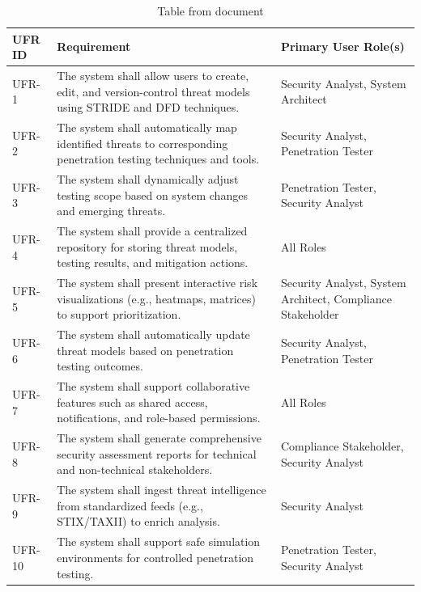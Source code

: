 \documentclass[12pt,a4paper]{report}
\begin{document}
\begin{table}[H]
\centering
\small
\begin{tabularx}{\textwidth}{|l|l|l|}
\hline
UFR ID & Requirement & Primary User Role(s) \\
\hline\hline
UFR-1 & The system shall allow users to create, edit, and version-control threat models using STRIDE and DFD techniques. & Security Analyst, System Architect \\
\hline
UFR-2 & The system shall automatically map identified threats to corresponding penetration testing techniques and tools. & Security Analyst, Penetration Tester \\
\hline
UFR-3 & The system shall dynamically adjust testing scope based on system changes and emerging threats. & Penetration Tester, Security Analyst \\
\hline
UFR-4 & The system shall provide a centralized repository for storing threat models, testing results, and mitigation actions. & All Roles \\
\hline
UFR-5 & The system shall present interactive risk visualizations (e.g., heatmaps, matrices) to support prioritization. & Security Analyst, System Architect, Compliance Stakeholder \\
\hline
UFR-6 & The system shall automatically update threat models based on penetration testing outcomes. & Security Analyst, Penetration Tester \\
\hline
UFR-7 & The system shall support collaborative features such as shared access, notifications, and role-based permissions. & All Roles \\
\hline
UFR-8 & The system shall generate comprehensive security assessment reports for technical and non-technical stakeholders. & Compliance Stakeholder, Security Analyst \\
\hline
UFR-9 & The system shall ingest threat intelligence from standardized feeds (e.g., STIX/TAXII) to enrich analysis. & Security Analyst \\
\hline
UFR-10 & The system shall support safe simulation environments for controlled penetration testing. & Penetration Tester, Security Analyst \\
\hline
\end{tabularx}
\caption{Table from document}
\end{table}
\end{document}
